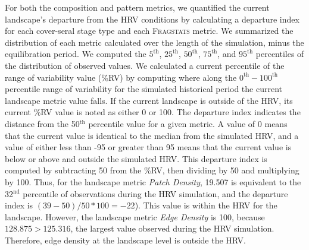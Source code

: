 For both the composition and pattern metrics, we quantified the current landscape's departure from the HRV conditions by calculating a departure index for each cover-seral stage type and each \textsc{Fragstats} metric. We summarized the distribution of each metric calculated over the length of the simulation, minus the equilibration period. We computed the $5^{\text{th}}$, $25^{\text{th}}$, $50^{\text{th}}$, $75^{\text{th}}$, and $95^{\text{th}}$ percentiles of the distribution of observed values. We calculated a current percentile of the range of variability value (\%RV) by computing where along the $0^{\text{th}}-100^{\text{th}}$ percentile range of variability for the simulated historical period the current landscape metric value falls. If the current landscape is outside of the HRV, its current \%RV value is noted as either 0 or 100. The departure index indicates the distance from the 50$^{\text{th}}$ percentile value for a given metric. A value of 0 means that the current value is identical to the median from the simulated HRV, and a value of either less than -95 or greater than 95 means that the current value is below or above and outside the simulated HRV. This departure index is computed by subtracting 50 from the \%RV, then dividing by 50 and multiplying by 100. Thus, for the landscape metric \emph{Patch Density}, 19.507 is equivalent to the 32$^{\text{nd}}$ percentile of observations during the HRV simulation, and the departure index is $(39-50)/50*100 = -22$). This value is within the HRV for the landscape. However, the landscape metric \emph{Edge Density} is 100, because $128.875 > 125.316$, the largest value observed during the HRV simulation. Therefore, edge density at the landscape level is outside the HRV.


\clearpage
